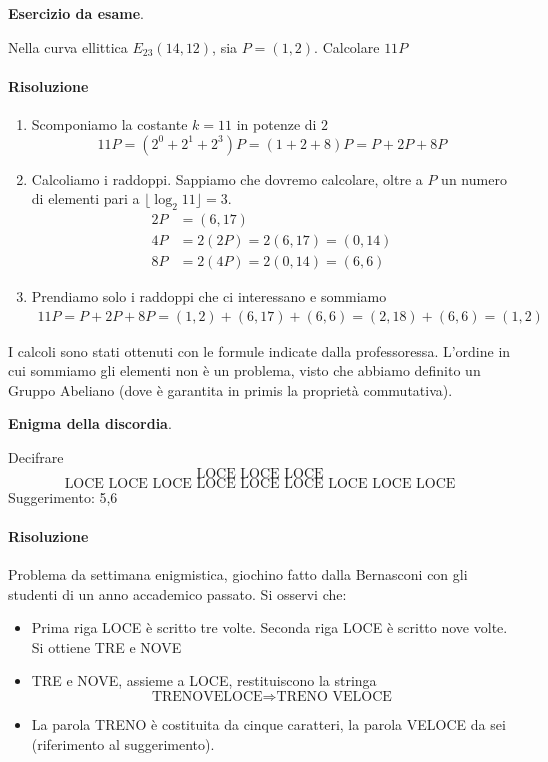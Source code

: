 \begin{framed}
	\noindent \textbf{Esercizio da esame}. 
	
	\noindent Nella curva ellittica $E_{23}(14, 12)$, sia $P = (1, 2)$. Calcolare $11 P$
	
	\paragraph{Risoluzione} 
	\begin{enumerate}
		\item Scomponiamo la costante $k=11$ in potenze di $2$
		$$11P=(2^0+2^1+2^3)P=(1+2+8)P=P+2P+8P$$
		\item Calcoliamo i raddoppi. Sappiamo che dovremo calcolare, oltre a $P$ un numero di elementi pari a $\lfloor \log_2 11 \rfloor=3$.
		\begin{align*}
			2P&=(6,17)\\
			4P&=2(2P)=2(6,17)=(0,14)\\
			8P&=2(4P)=2(0,14)=(6,6)
		\end{align*}
		\item Prendiamo solo i raddoppi che ci interessano e sommiamo
		\begin{align*}
			11P=P+2P+8P=(1,2)+(6,17)+(6,6)=(2,18)+(6,6)=(1,2)
		\end{align*}
	\end{enumerate}
	I calcoli sono stati ottenuti con le formule indicate dalla professoressa. L'ordine in cui sommiamo gli elementi non è un problema, visto che abbiamo definito un Gruppo Abeliano (dove è garantita in primis la proprietà commutativa).
\end{framed} 

\begin{framed}
	\noindent \textbf{Enigma della discordia}. 
	
	\noindent Decifrare
	$$\text{LOCE LOCE LOCE}$$
	$$\text{LOCE LOCE LOCE LOCE LOCE LOCE LOCE LOCE LOCE}$$
	Suggerimento: 5,6
	
	\paragraph{Risoluzione}  Problema da settimana enigmistica, giochino fatto dalla Bernasconi con gli studenti di un anno accademico passato. Si osservi che:
	\begin{itemize}
		\item Prima riga LOCE è scritto tre volte. Seconda riga LOCE è scritto nove volte. Si ottiene TRE e NOVE
		\item TRE e NOVE, assieme a LOCE, restituiscono la stringa
		$$\text{TRENOVELOCE} \Longrightarrow \text{TRENO VELOCE}$$
		\item La parola TRENO è costituita da cinque caratteri, la parola VELOCE da sei (riferimento al suggerimento).
	\end{itemize}
\end{framed} 